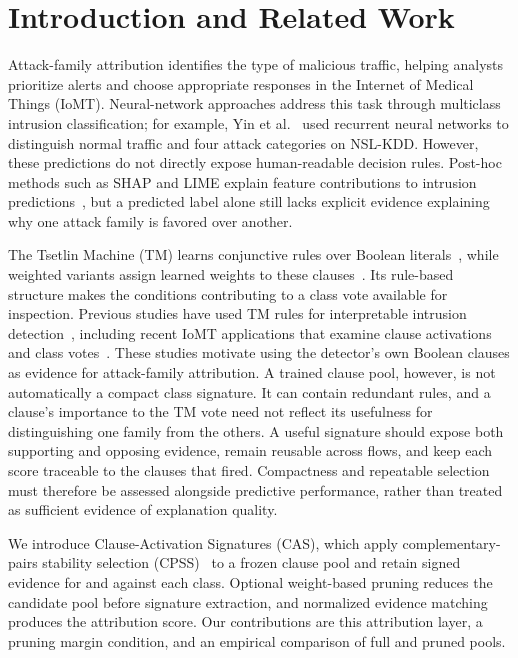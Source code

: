 \documentclass[conference]{IEEEtran}
\begin{document}
\section{Introduction and Related Work}
Attack-family attribution identifies the type of malicious traffic,
helping analysts prioritize alerts and choose appropriate responses in
the Internet of Medical Things (IoMT). Neural-network approaches address
this task through multiclass intrusion classification; for example,
Yin et al.~\cite{yin2017} used recurrent neural networks to distinguish
normal traffic and four attack categories on NSL-KDD. However, these
predictions do not directly expose human-readable decision rules.
Post-hoc methods such as SHAP and LIME explain feature contributions to
intrusion predictions~\cite{xaiids2025}, but a predicted label alone
still lacks explicit evidence explaining why one attack family is
favored over another.

The Tsetlin Machine (TM) learns conjunctive rules over Boolean
literals~\cite{granmo2018}, while weighted variants assign learned
weights to these clauses~\cite{phoulady2020}. Its rule-based structure
makes the conditions contributing to a class vote available for
inspection. Previous studies have used TM rules for interpretable
intrusion detection~\cite{abeyrathna2020}, including recent IoMT
applications that examine clause activations and class
votes~\cite{jaiswal2026iomt,jaiswal2026medsec}. These studies motivate
using the detector's own Boolean clauses as evidence for attack-family
attribution. A trained clause pool, however, is not automatically a compact class
signature. It can contain redundant rules, and a clause's importance
to the TM vote need not reflect its usefulness for distinguishing one
family from the others. A useful signature should expose both
supporting and opposing evidence, remain reusable across flows, and
keep each score traceable to the clauses that fired. Compactness and
repeatable selection must therefore be assessed alongside predictive
performance, rather than treated as sufficient evidence of explanation
quality.

We introduce Clause-Activation Signatures (CAS), which apply
complementary-pairs stability selection
(CPSS)~\cite{meinshausen2010,shah2013} to a frozen clause pool and retain
signed evidence for and against each class. Optional weight-based
pruning reduces the candidate pool before signature extraction, and
normalized evidence matching produces the attribution score. Our
contributions are this attribution layer, a pruning margin condition,
and an empirical comparison of full and pruned pools.
\end{document}
